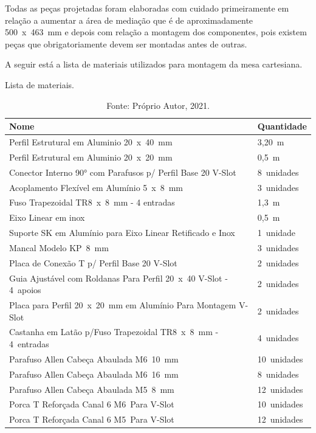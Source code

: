 Todas as peças projetadas foram elaboradas com cuidado primeiramente em relação a aumentar 
a área de mediação que é de aproximadamente 500~x~463~mm e depois com relação a montagem dos 
componentes, pois existem peças que obrigatoriamente devem ser montadas antes de outras. 

A seguir está a lista de materiais utilizados para montagem da mesa cartesiana.

\begin{table}[H]
    \footnotesize
    \centering
    \caption{Lista de materiais.}
    \begin{tabular}{ll}
        \hline
        \textbf{Nome} & \textbf{Quantidade}\\
        \hline
        Perfil Estrutural em Aluminio 20~x~40~mm & 3,20~m\\
        Perfil Estrutural em Aluminio 20~x~20~mm & 0,5~m\\
        Conector Interno 90° com Parafusos p/ Perfil Base 20 V-Slot & 8~unidades\\
        Acoplamento Flexível em Alumínio 5~x~8~mm & 3~unidades\\
        Fuso Trapezoidal TR8~x~8~mm - 4 entradas & 1,3~m\\
        Eixo Linear em inox & 0,5~m\\
        Suporte SK em Alumínio para Eixo Linear Retificado e Inox & 1~unidade\\
        Mancal Modelo KP~8~mm & 3~unidades\\
        Placa de Conexão T p/ Perfil Base 20 V-Slot &2~unidades\\
        Guia Ajustável com Roldanas Para Perfil 20~x~40 V-Slot - 4~apoios & 2~unidades\\
        Placa para Perfil 20~x~20~mm em Alumínio Para Montagem V-Slot & 2~unidades\\
        Castanha em Latão p/Fuso Trapezoidal TR8~x~8~mm - 4~entradas & 4~unidades\\
        Parafuso Allen Cabeça Abaulada M6~10~mm & 10~unidades\\
        Parafuso Allen Cabeça Abaulada M6~16~mm & 8~unidades\\
        Parafuso Allen Cabeça Abaulada M5~8~mm & 12~unidades\\
        Porca T Reforçada Canal 6 M6~Para V-Slot & 10~unidades\\
        Porca T Reforçada Canal 6 M5~Para V-Slot & 12~unidades\\
        \hline       
    \end{tabular}
    \caption*{Fonte: Próprio Autor, 2021.}
    \label{tab:listamateriais}
\end{table}

